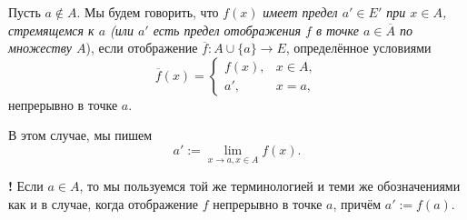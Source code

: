 \begin{definition}\label{the_main_def_of_limit}
    Пусть $a \notin A$. Мы будем говорить, что $f(x)$ \textit{имеет предел $a' \in E'$ при $x \in A$, стремящемся к $a$ (или $a'$ есть предел отображения $f$ в точке $a\in \overline{A}$ по множеству $A$}), если отображение $\overline{f}:A \cup \{a\} \to E$, определённое условиями
    \[
     \overline{f}(x) = \begin{cases}
         f(x), & x \in A, \\
         a', & x = a,
     \end{cases}
    \]
    непрерывно в точке $a$.
\end{definition}

В этом случае, мы пишем
\[
 a' := \lim_{x\to a, x \in A} f(x).
\]

\begin{mydanger}{\bf{!}}
    Если $a \in A$, то мы пользуемся той же терминологией и теми же обозначениями как и в случае, когда отображение $f$ непрерывно в точке $a$, причём $a':=f(a).$
\end{mydanger}

